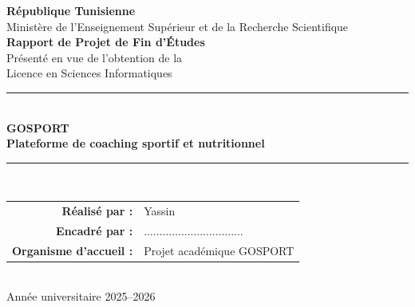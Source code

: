 \documentclass[12pt,a4paper]{report}
\begin{document}
\begin{titlepage}
\thispagestyle{empty}
\begin{center}
    \vspace*{0.5cm}
    {\Large \textbf{République Tunisienne}}\\
    {\large Ministère de l'Enseignement Supérieur et de la Recherche Scientifique}\\[1.2cm]

    {\Large \textbf{Rapport de Projet de Fin d'Études}}\\[0.8cm]
    {\large Présenté en vue de l'obtention de la}\\
    {\large Licence en Sciences Informatiques}\\[1.4cm]

    \rule{\textwidth}{0.6pt}\\[0.5cm]
    {\Huge \textbf{GOSPORT}}\\[0.4cm]
    {\LARGE \textbf{Plateforme de coaching sportif et nutritionnel}}\\[0.5cm]
    \rule{\textwidth}{0.6pt}\\[1.5cm]

    \begin{tabular}{rl}
        \textbf{Réalisé par :} & Yassin \\
        \textbf{Encadré par :} & ................................ \\
        \textbf{Organisme d'accueil :} & Projet académique GOSPORT \\
    \end{tabular}\\[1.8cm]

    \vfill
    {\large Année universitaire 2025--2026}
\end{center}
\end{titlepage}

\cleardoublepage
{}

\dominitoc


\tableofcontents
\listoffigures
\listoftables
\mtcaddchapter

\clearpage
{}














\end{document}
